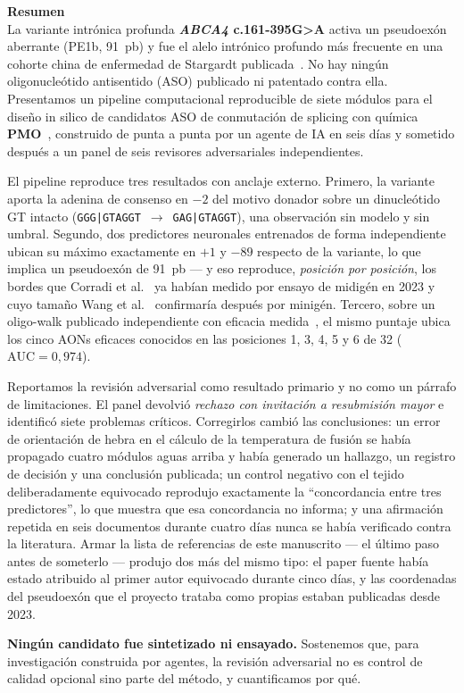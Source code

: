 \documentclass[11pt,a4paper]{article}
\begin{document}
\vspace{1.2em}

\begin{center}
\begin{minipage}{0.92\linewidth}
{\bfseries\large Resumen}\\[0.4em]
\small
La variante intrónica profunda \textbf{\emph{ABCA4} c.161-395G>A} activa un pseudoexón aberrante
(PE1b, 91~pb) y fue el alelo intrónico profundo más frecuente en una cohorte china de enfermedad de
Stargardt publicada~\cite{wang2025}. No hay ningún oligonucleótido antisentido (ASO) publicado ni
patentado contra ella. Presentamos un pipeline computacional reproducible de siete módulos para el
diseño in silico de candidatos ASO de conmutación de splicing con química \textbf{PMO}~\cite{summerton1997},
construido de punta a punta por un agente de IA en seis días y sometido después a un panel de seis
revisores adversariales independientes.

El pipeline reproduce tres resultados con anclaje externo. Primero, la variante aporta la adenina de
consenso en $-2$ del motivo donador sobre un dinucleótido GT intacto
(\texttt{GGG|GTAGGT}~$\rightarrow$~\texttt{GAG|GTAGGT}), una observación sin modelo y sin umbral.
Segundo, dos predictores neuronales entrenados de forma independiente~\cite{jaganathan2019,zeng2022}
ubican su máximo exactamente en $+1$ y $-89$ respecto de la variante, lo que implica un pseudoexón
de 91~pb --- y eso reproduce, \emph{posición por posición}, los bordes que Corradi et
al.~\cite{corradi2023} ya habían medido por ensayo de midigén en 2023 y cuyo tamaño Wang et
al.~\cite{wang2025} confirmaría después por minigén. Tercero, sobre un oligo-walk publicado
independiente con eficacia medida~\cite{kaltak2023}, el mismo puntaje ubica los cinco AONs eficaces
conocidos en las posiciones 1, 3, 4, 5 y 6 de 32 ($\mathrm{AUC}=0{,}974$).

Reportamos la revisión adversarial como resultado primario y no como un párrafo de limitaciones. El
panel devolvió \emph{rechazo con invitación a resubmisión mayor} e identificó siete problemas
críticos. Corregirlos cambió las conclusiones: un error de orientación de hebra en el cálculo de la
temperatura de fusión se había propagado cuatro módulos aguas arriba y había generado un hallazgo,
un registro de decisión y una conclusión publicada; un control negativo con el tejido
deliberadamente equivocado reprodujo exactamente la ``concordancia entre tres predictores'', lo que
muestra que esa concordancia no informa; y una afirmación repetida en seis documentos durante cuatro
días nunca se había verificado contra la literatura. Armar la lista de referencias de este
manuscrito --- el último paso antes de someterlo --- produjo dos más del mismo tipo: el paper fuente
había estado atribuido al primer autor equivocado durante cinco días, y las coordenadas del
pseudoexón que el proyecto trataba como propias estaban publicadas desde 2023.

\textbf{Ningún candidato fue sintetizado ni ensayado.} Sostenemos que, para investigación construida
por agentes, la revisión adversarial no es control de calidad opcional sino parte del método, y
cuantificamos por qué.
\end{minipage}
\end{center}
\end{document}
